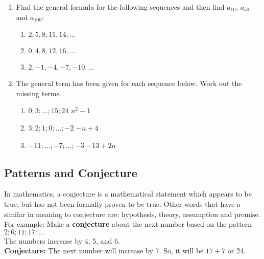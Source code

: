 \documentclass[10pt,a4paper,titlepage,twoside,openright]{report}
\begin{document}
{\begin{enumerate}
\item{Find the general formula for the following sequences and then find $a_{10}$, $a_{50}$ and $a_{100}$:}
\begin{enumerate}
\item{$2, 5, 8, 11, 14, \ldots$}
\item{$0, 4, 8, 12, 16, \ldots$}
\item{$2, -1, -4, -7, -10, \ldots$}
\end{enumerate}
\item{The general term has been given for each sequence below. Work out the missing terms.}
\begin{enumerate}
\item{$	0; 3; ...; 15; 24$   \qquad	 $n^2 - 1$}
\item{$	3; 2; 1; 0; ...; -2$ \qquad  $-n + 4$}
\item{$-11;...; -7; ...; -3$  \qquad  $-13 + 2n$}
\end{enumerate}
\end{enumerate}
}

\subsection{Patterns and Conjecture}

In mathematics, a conjecture is a mathematical statement which appears to be true, but has not been formally proven to be true. Other words that have a similar in meaning to conjecture are: hypothesis, theory, assumption and premise.\\
For example:  Make a \textbf{conjecture} about the next number based on the pattern $2;	6;	 11; 17:...$\\
The numbers increase by 4, 5, and 6.\\
\textbf{Conjecture:} The next number will increase by 7. So, it will be $17 + 7$ or 24.
\end{document}

